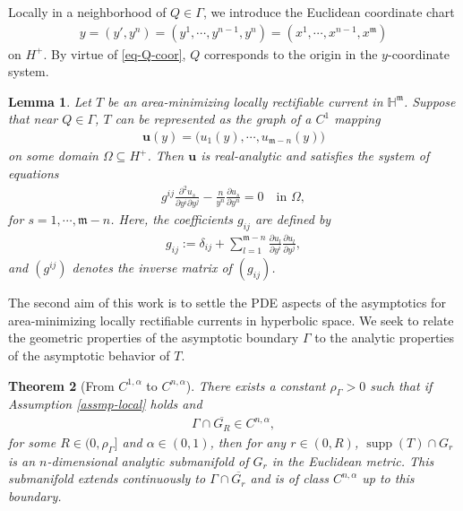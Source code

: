 \documentclass[11pt,reqno]{amsart}
\newcommand{\fm}{\mathfrak{m}}
\newtheorem{theorem}{Theorem}[section]
\newtheorem{lemma}[theorem]{Lemma}
\theoremstyle{definition}
\numberwithin{equation}{section}
\begin{document}
Locally in a neighborhood of $Q\in \Gamma$, we introduce the Euclidean coordinate chart
\begin{align}\label{eq-y}
y=(y', y^n)=(y^1, \cdots, y^{n-1}, y^n)= (x^1,\cdots, x^{n-1}, x^\fm)
\end{align}
on $H^+$. By virtue of \eqref{eq-Q-coor}, $Q$ corresponds to the origin in the $y$-coordinate system.

\begin{lemma}\label{lem-Main}
Let $T$ be an area-minimizing locally rectifiable current in $\mathbb{H}^\fm$. Suppose that near $Q\in \Gamma$, $T$ can be represented as the graph of a $C^1$ mapping
\begin{align}
\mathbf{u}(y) = \bigl(u_1(y), \cdots, u_{\fm-n}(y)\bigr)
\end{align}
on some domain $\Omega \subseteq H^+$. Then $\mathbf{u}$ is real-analytic and satisfies the system of equations
\begin{align}\label{eq-main-0}
g^{ij}\frac{\partial^2 u_s}{\partial y^i \partial y^j} - \frac{n}{y^{n}} \frac{\partial u_s}{\partial y^{n}} =0 \quad \text{in } \Omega,
\end{align}
for $s=1, \cdots, \fm-n$. Here, the coefficients $g_{ij}$ are defined by
\begin{align}\label{eq-gij}
g_{ij}:=\delta_{ij} +\sum_{l=1}^{\fm -n} \frac{\partial u_l}{\partial y^i}\frac{\partial u_l}{\partial y^j},
\end{align}
and $(g^{ij})$ denotes the inverse matrix of $(g_{ij})$.
\end{lemma}


 
The second aim of this work is to settle the PDE aspects of the asymptotics for area-minimizing locally rectifiable currents in hyperbolic space. We seek to relate the geometric properties of the asymptotic boundary $\Gamma$ to the analytic properties of the asymptotic behavior of $T$.

\begin{theorem}[From $C^{1,\alpha}$ to $C^{n,\alpha}$]\label{thm-Cna}
There exists a constant $\rho_\Gamma>0$ such that if Assumption \ref{assmp-local} holds and
\begin{align}
\Gamma \cap \overline{G_R} \in C^{n,\alpha},
\end{align}
for some $R\in (0, \rho_\Gamma]$ and $\alpha\in (0,1)$, then for any $r\in (0, R)$, $\operatorname{supp}(T) \cap G_r$ is an $n$-dimensional analytic submanifold of $G_r$ in the Euclidean metric. This submanifold extends continuously to $\Gamma \cap \overline{G_r}$ and is of class $C^{n,\alpha}$ up to this boundary.
\end{theorem}
\end{document}
